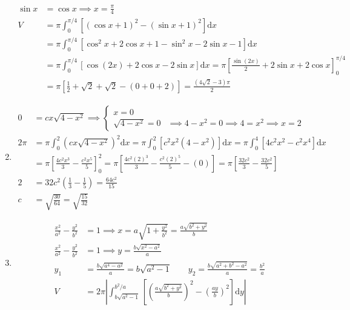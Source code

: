 \documentclass[12pt, A4]{report}
\renewcommand{\d}{\text{d}}
\begin{document}
\begin{enumerate}
					\begin{align*}
						\sin x &= \cos x 
								\implies x = \frac{\pi}{4} \\
						V &= \pi\int_0^{\pi/4}\left[(\cos x + 1)^2 - (\sin x + 1)^2\right]\d x \\
							&= \pi\int_0^{\pi/4}\left[\cos^2x + 2\cos x + 1 - \sin^2 x - 2\sin x - 1\right]\d x \\
							&= \pi\int_0^{\pi/4}\left[\cos(2x) + 2\cos x - 2\sin x\right]\d x
								= \pi\left[\frac{\sin(2x)}{2} + 2\sin x + 2\cos x\right]_0^{\pi/4} \\
							&= \pi\left[\frac{1}{2} + \sqrt{2} + \sqrt{2} - (0 + 0 + 2)\right]
								= \frac{(4\sqrt{2} - 3)\pi}{2}
					\end{align*}
				\item
					\begin{align*}
						0 &= cx\sqrt{4 - x^2} \implies 
							\begin{cases}
	 							x = 0 \\
	 							\sqrt{4 - x^2} = 0 &\implies 4 - x^2 = 0 
	 								\implies 4 = x^2 
	 								\implies x = 2
							\end{cases} \\
						2\pi &= \pi\int_0^2\left(cx\sqrt{4 - x^2}\right)^2\d x
									= \pi\int_0^2\left[c^2x^2(4 - x^2)\right]\d x
									= \pi\int_0^4\left[4c^2x^2 - c^2x^4\right]\d x \\
								&= \pi\left[\frac{4c^2x^3}{3} - \frac{c^2x^5}{5}\right]_0^2
									= \pi\left[\frac{4c^2(2)^3}{3} - \frac{c^2(2)^5}{5} - (0)\right]
									= \pi\left[\frac{32c^2}{3} - \frac{32c^2}{5}\right] \\
							2 &= 32c^2\left(\frac{1}{3} - \frac{1}{5}\right) 
									= \frac{64c^2}{15} \\
							c &= \sqrt{\frac{30}{64}} = \sqrt{\frac{15}{32}}
					\end{align*}
				\item
					\begin{align*}
						\frac{x^2}{a^2} - \frac{y^2}{b^2} &= 1 
									\implies x = a\sqrt{1 + \frac{y^2}{b^2}}
										= \frac{a\sqrt{b^2 + y^2}}{b} \\
							\frac{x^2}{a^2} - \frac{y^2}{b^2} &= 1 \implies y 
									= \frac{b\sqrt{x^2 - a^2}}{a} \\
							y_1 &= \frac{b\sqrt{a^4 - a^2}}{a} 
									= b\sqrt{a^2 - 1} \qquad 
								y_2 = \frac{b\sqrt{a^2 + b^2 - a^2}}{a} 
									= \frac{b^2}{a} \\
						V &= 2\pi\left|\int_{b\sqrt{a^2 - 1}}^{b^2/a}\left[\left(\frac{a\sqrt{b^2 + y^2}}{b}\right)^2 - \left(\frac{ay}{b}\right)^2\right]\d y\right|

\end{align*}
\end{enumerate}
\end{document}
